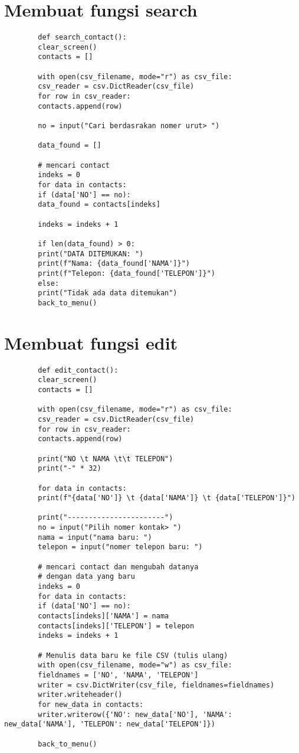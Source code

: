 \documentclass{article}
\begin{document}
	\section{Membuat fungsi search}
	\begin{lstlisting}
		def search_contact():
		clear_screen()
		contacts = []
		
		with open(csv_filename, mode="r") as csv_file:
		csv_reader = csv.DictReader(csv_file)
		for row in csv_reader:
		contacts.append(row)
		
		no = input("Cari berdasrakan nomer urut> ")
		
		data_found = []
		
		# mencari contact
		indeks = 0
		for data in contacts:
		if (data['NO'] == no):
		data_found = contacts[indeks]
		
		indeks = indeks + 1
		
		if len(data_found) > 0:
		print("DATA DITEMUKAN: ")
		print(f"Nama: {data_found['NAMA']}")
		print(f"Telepon: {data_found['TELEPON']}")
		else:
		print("Tidak ada data ditemukan")
		back_to_menu()
	\end{lstlisting}

	\section{Membuat fungsi edit}
	\begin{lstlisting}
		def edit_contact():
		clear_screen()
		contacts = []
		
		with open(csv_filename, mode="r") as csv_file:
		csv_reader = csv.DictReader(csv_file)
		for row in csv_reader:
		contacts.append(row)
		
		print("NO \t NAMA \t\t TELEPON")
		print("-" * 32)
		
		for data in contacts:
		print(f"{data['NO']} \t {data['NAMA']} \t {data['TELEPON']}")
		
		print("-----------------------")
		no = input("Pilih nomer kontak> ")
		nama = input("nama baru: ")
		telepon = input("nomer telepon baru: ")
		
		# mencari contact dan mengubah datanya
		# dengan data yang baru
		indeks = 0
		for data in contacts:
		if (data['NO'] == no):
		contacts[indeks]['NAMA'] = nama
		contacts[indeks]['TELEPON'] = telepon
		indeks = indeks + 1
		
		# Menulis data baru ke file CSV (tulis ulang)
		with open(csv_filename, mode="w") as csv_file:
		fieldnames = ['NO', 'NAMA', 'TELEPON']
		writer = csv.DictWriter(csv_file, fieldnames=fieldnames)
		writer.writeheader()
		for new_data in contacts:
		writer.writerow({'NO': new_data['NO'], 'NAMA': new_data['NAMA'], 'TELEPON': new_data['TELEPON']}) 
		
		back_to_menu()
	\end{lstlisting}
\end{document}
